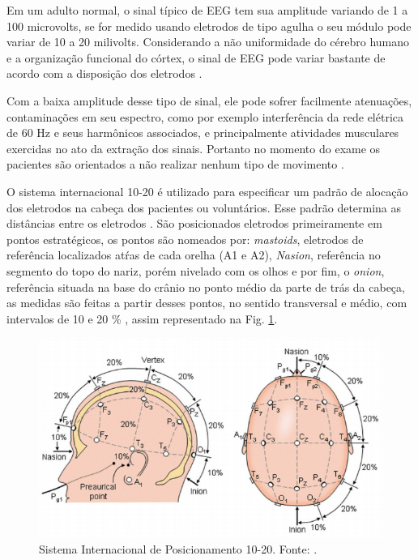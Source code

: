 Em um adulto normal, o sinal típico de EEG tem sua amplitude variando de 1 a 100 microvolts, se for medido usando eletrodos de tipo agulha o seu módulo pode variar de 10 a 20 milivolts. Considerando a não uniformidade do cérebro humano e a organização funcional do córtex, o sinal de EEG pode variar bastante de acordo com a disposição dos eletrodos \cite{SIULYDissertacao}.

Com a baixa amplitude desse tipo de sinal, ele pode sofrer facilmente atenuações, contaminações em seu espectro, como por exemplo interferência da rede elétrica de 60 Hz e seus harmônicos associados, e principalmente atividades musculares exercidas no ato da extração dos sinais. Portanto no momento do exame os pacientes são orientados a não realizar nenhum tipo de movimento \cite{raobrain}.

 O sistema internacional 10-20 é utilizado para especificar um padrão de alocação dos eletrodos na cabeça dos pacientes ou voluntários. Esse padrão determina as distâncias entre os eletrodos \cite{Siulybook}. São posicionados eletrodos primeiramente em pontos estratégicos, os pontos são nomeados por: \textit{mastoids}, eletrodos de referência localizados atŕas de cada orelha (A1 e A2), \textit{Nasion}, referência no segmento do topo do nariz, porém nivelado com os olhos e por fim, o \textit{onion}, referência situada na base do crânio no ponto médio da parte de trás da cabeça, as medidas são feitas a partir desses pontos, no sentido transversal e médio,  com intervalos de 10 e 20 \% \cite{raobrain}, assim representado na Fig. \ref{padrao1020}.

\begin{figure}[h]
	\centering
	\includegraphics[scale=0.75]{figuras/padrao1020.PNG}
	\caption{Sistema Internacional de Posicionamento 10-20. Fonte: \cite{campisi2012eeg}.}
	\label{padrao1020}
\end{figure}

